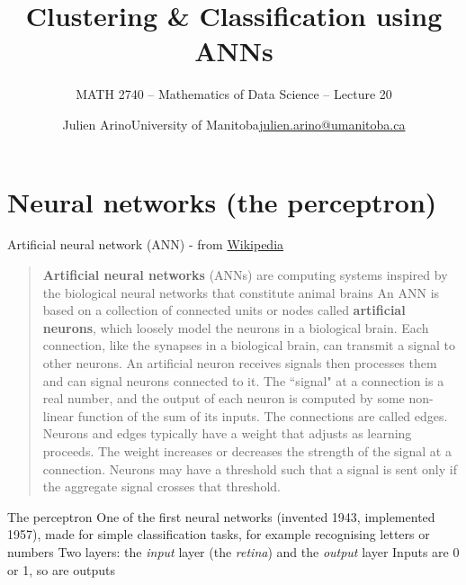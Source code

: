 \documentclass[aspectratio=169]{beamer}\usepackage[]{graphicx}\usepackage[]{xcolor}
\subtitle{MATH 2740 -- Mathematics of Data Science -- Lecture 20}
\title{Clustering \& Classification using ANNs}
\author{\texorpdfstring{Julien Arino\newline University of Manitoba\newline\url{julien.arino@umanitoba.ca}}{Julien Arino}}
\begin{document}

\section{Neural networks (the perceptron)}

\begin{frame}{Artificial neural network (ANN) - from \href{https://en.wikipedia.org/wiki/Artificial_neural_network}{Wikipedia}}
    \begin{quote}
    \textbf{Artificial neural networks} (ANNs) are computing systems inspired by the biological neural networks that constitute animal brains
    \vfill
    An ANN is based on a collection of connected units or nodes called \textbf{artificial neurons}, which loosely model the neurons in a biological brain. Each connection, like the synapses in a biological brain, can transmit a signal to other neurons. An artificial neuron receives signals then processes them and can signal neurons connected to it. The ``signal" at a connection is a real number, and the output of each neuron is computed by some non-linear function of the sum of its inputs. The connections are called edges. Neurons and edges typically have a weight that adjusts as learning proceeds. The weight increases or decreases the strength of the signal at a connection. Neurons may have a threshold such that a signal is sent only if the aggregate signal crosses that threshold.
    \end{quote}
\end{frame}


\begin{frame}{The perceptron}
    One of the first neural networks (invented 1943, implemented 1957), made for simple classification tasks, for example recognising letters or numbers
    \vfill
    Two layers: the \emph{input} layer (the \emph{retina}) and the \emph{output} layer
    \vfill
    Inputs are 0 or 1, so are outputs
\end{frame}
\end{document}
